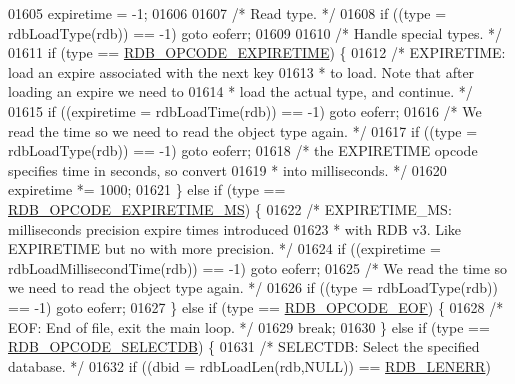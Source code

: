 \begin{DoxyCode}
{{{{{{{{{{{{{{{{{{{{{{{{{{{{01605         expiretime = -1;
01606 
01607         \textcolor{comment}{/* Read type. */}
01608         \textcolor{keywordflow}{if} ((type = rdbLoadType(rdb)) == -1) \textcolor{keywordflow}{goto} eoferr;
01609 
01610         \textcolor{comment}{/* Handle special types. */}
01611         \textcolor{keywordflow}{if} (type == \hyperlink{rdb_8h_a32013d8fe12eeff5f8c1de859aae8a55}{RDB\_OPCODE\_EXPIRETIME}) \{
01612             \textcolor{comment}{/* EXPIRETIME: load an expire associated with the next key}
01613 \textcolor{comment}{             * to load. Note that after loading an expire we need to}
01614 \textcolor{comment}{             * load the actual type, and continue. */}
01615             \textcolor{keywordflow}{if} ((expiretime = rdbLoadTime(rdb)) == -1) \textcolor{keywordflow}{goto} eoferr;
01616             \textcolor{comment}{/* We read the time so we need to read the object type again. */}
01617             \textcolor{keywordflow}{if} ((type = rdbLoadType(rdb)) == -1) \textcolor{keywordflow}{goto} eoferr;
01618             \textcolor{comment}{/* the EXPIRETIME opcode specifies time in seconds, so convert}
01619 \textcolor{comment}{             * into milliseconds. */}
01620             expiretime *= 1000;
01621         \} \textcolor{keywordflow}{else} \textcolor{keywordflow}{if} (type == \hyperlink{rdb_8h_a718021856b2b0cf1c9c907a3a91a39c4}{RDB\_OPCODE\_EXPIRETIME\_MS}) \{
01622             \textcolor{comment}{/* EXPIRETIME\_MS: milliseconds precision expire times introduced}
01623 \textcolor{comment}{             * with RDB v3. Like EXPIRETIME but no with more precision. */}
01624             \textcolor{keywordflow}{if} ((expiretime = rdbLoadMillisecondTime(rdb)) == -1) \textcolor{keywordflow}{goto} eoferr;
01625             \textcolor{comment}{/* We read the time so we need to read the object type again. */}
01626             \textcolor{keywordflow}{if} ((type = rdbLoadType(rdb)) == -1) \textcolor{keywordflow}{goto} eoferr;
01627         \} \textcolor{keywordflow}{else} \textcolor{keywordflow}{if} (type == \hyperlink{rdb_8h_af4c616d96f3dc8d44911f7fff2a712da}{RDB\_OPCODE\_EOF}) \{
01628             \textcolor{comment}{/* EOF: End of file, exit the main loop. */}
01629             \textcolor{keywordflow}{break};
01630         \} \textcolor{keywordflow}{else} \textcolor{keywordflow}{if} (type == \hyperlink{rdb_8h_a08e0489a0baf79997ee8411e850d6c70}{RDB\_OPCODE\_SELECTDB}) \{
01631             \textcolor{comment}{/* SELECTDB: Select the specified database. */}
01632             \textcolor{keywordflow}{if} ((dbid = rdbLoadLen(rdb,NULL)) == \hyperlink{rdb_8h_aa66b6ad7261656029e6a67cf78432b2d}{RDB\_LENERR})
}}}}}}}}}}}}}}}}}}}}}}}}}}}}
\end{DoxyCode}
